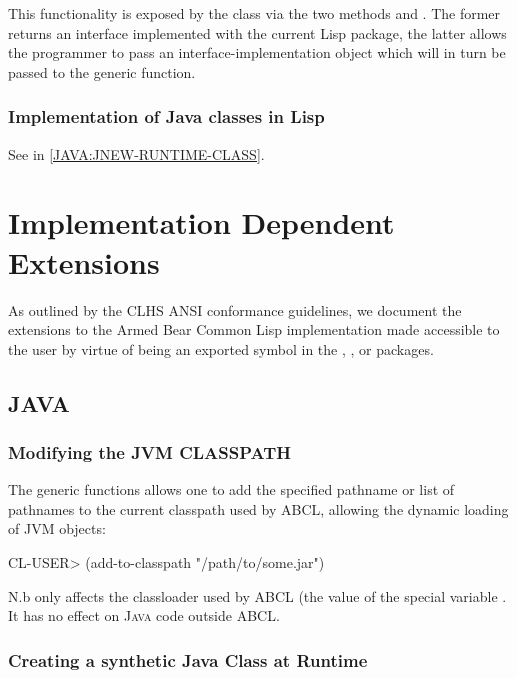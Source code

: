 \documentclass[10pt]{book}
\begin{document}
This functionality is exposed by the class  via
the two methods  and
. The former returns an interface
implemented with the current Lisp package, the latter allows the
programmer to pass an interface-implementation object which will in turn
be passed to the  generic function.

\subsection{Implementation of Java classes in Lisp}

See  in \ref{JAVA:JNEW-RUNTIME-CLASS}.


\chapter{Implementation Dependent Extensions}

As outlined by the \textsc{CLHS} \textsc{ANSI} conformance guidelines,
we document the extensions to the Armed Bear Common Lisp implementation made
accessible to the user by virtue of being an exported symbol in the
, , or  packages.

\section{JAVA}

\subsection{Modifying the JVM CLASSPATH}

The  generic functions allows one to add the
specified pathname or list of pathnames to the current classpath
used by \textsc{ABCL}, allowing the dynamic loading of \textsc{JVM} objects:

\begin{listing-lisp}
CL-USER> (add-to-classpath "/path/to/some.jar")
\end{listing-lisp}

N.b  only affects the classloader used by \textsc{ABCL}
(the value of the special variable . It has
no effect on \textsc{Java} code outside \textsc{ABCL}.

\subsection{Creating a synthetic Java Class at Runtime}
\end{document}

